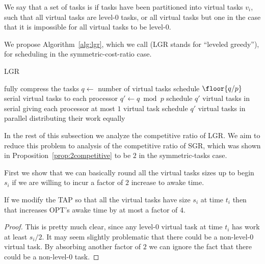 We say that a set of tasks is  if tasks have been
partitioned into virtual tasks $v_i$, such that all virtual
tasks are level-$0$ tasks, or all virtual tasks but one in the
case that it is impossible for all virtual tasks to be level-$0$.

We propose Algorithm~\ref{alg:lgr}, which we call 
(LGR stands for \enquote{leveled greedy}),
for scheduling in the symmetric-cost-ratio case.

\begin{algorithm}
  \caption{LGR}
  \label{alg:lgr}
  \begin{algorithmic}
        \State fully compress the tasks 
        \State $q \gets $ number of virtual tasks 
        \State schedule $\floor{q/p}$ serial virtual tasks to each processor
        \State $q' \gets q \bmod p$ 
          \State schedule $q'$ virtual tasks in serial
          \State giving each processor at most $1$ virtual task
        \Else
          \State schedule $q'$ virtual tasks in parallel
          \State distributing their work equally
        \EndIf
      \EndIf
    \EndWhile
  \end{algorithmic}
\end{algorithm}

In the rest of this subsection we analyze the competitive ratio
of LGR. We aim to reduce this problem to analysis of the
competitive ratio of SGR, which was shown in
Proposition~\ref{prop:2competitive} to be $2$ in the
symmetric-tasks case.

First we show that we can basically round all the virtual tasks
sizes up to begin $s_i$  if we are willing to incur a factor of
$2$ increase to awake time.
\begin{claim}
  If we modify the TAP so that all the virtual tasks have size
  $s_i$ at time $t_i$ then that increases OPT's awake time by at
  most a factor of $4$. 
\end{claim}
\begin{proof}
  This is pretty much clear, since any level-$0$ virtual task at
  time $t_i$ has work at least $s_i/2$. 
  It may seem slightly problematic that there could be a
  non-level-$0$ virtual task. By absorbing another factor of $2$
  we can ignore the fact that there could be a non-level-$0$
  task.

\end{proof}

